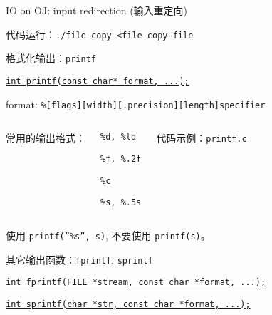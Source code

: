 \begin{frame}{IO on OJ: input redirection (输入重定向)}
  \centerline{代码运行：\texttt{./file-copy <file-copy-file}}
\end{frame}

\begin{frame}{格式化输出：\texttt{printf}}
  \centerline{\href{http://www.cplusplus.com/reference/cstdio/printf/}{\texttt{int printf(const char* format, ...);}}}

  \vspace{0.50cm}
  \centerline{format: \texttt{\%[flags][width][.precision][length]specifier}}

  \vspace{0.60cm}
  \pause
  \begin{columns}
      常用的输出格式：
      \begin{description}
	\item[Decimal integer] \texttt{\%d, \%ld}
	\item[Decimal float] \texttt{\%f, \%.2f}
	\item[Character] \texttt{\%c}
	\item[String] \texttt{\%s, \%.5s}
      \end{description}
      \centerline{代码示例：\texttt{printf.c}}
  \end{columns}

  \vspace{0.30cm}
  \centerline{使用 \texttt{printf(''\%s'', s)}, 不要使用 \texttt{printf(s)}。}
\end{frame}

\begin{frame}{其它输出函数：\texttt{fprintf}, \texttt{sprintf}}
  \centerline{\href{http://www.cplusplus.com/reference/cstdio/fprintf/}
  {\texttt{int fprintf(FILE *stream, const char *format, ...);}}}

  \vspace{0.50cm}
  \centerline{\href{http://www.cplusplus.com/reference/cstdio/sprintf/}
  {\texttt{int sprintf(char *str, const char *format, ...);}}}
\end{frame}

